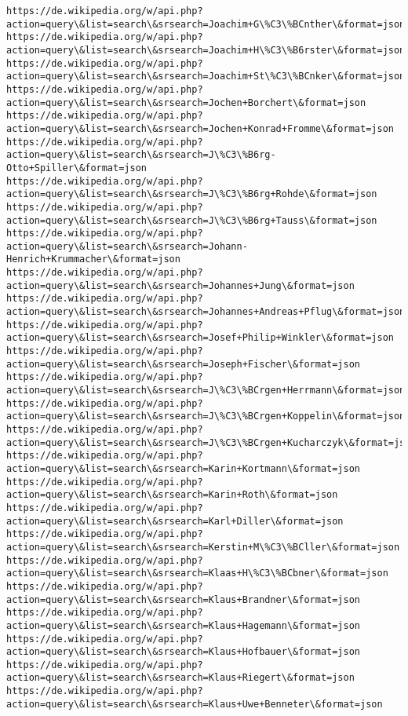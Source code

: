 \documentclass[11pt]{article}
\begin{document}
\begin{Verbatim}[commandchars=\\\{\}]
https://de.wikipedia.org/w/api.php?action=query\&list=search\&srsearch=Joachim+G\%C3\%BCnther\&format=json
https://de.wikipedia.org/w/api.php?action=query\&list=search\&srsearch=Joachim+H\%C3\%B6rster\&format=json
https://de.wikipedia.org/w/api.php?action=query\&list=search\&srsearch=Joachim+St\%C3\%BCnker\&format=json
https://de.wikipedia.org/w/api.php?action=query\&list=search\&srsearch=Jochen+Borchert\&format=json
https://de.wikipedia.org/w/api.php?action=query\&list=search\&srsearch=Jochen+Konrad+Fromme\&format=json
https://de.wikipedia.org/w/api.php?action=query\&list=search\&srsearch=J\%C3\%B6rg-Otto+Spiller\&format=json
https://de.wikipedia.org/w/api.php?action=query\&list=search\&srsearch=J\%C3\%B6rg+Rohde\&format=json
https://de.wikipedia.org/w/api.php?action=query\&list=search\&srsearch=J\%C3\%B6rg+Tauss\&format=json
https://de.wikipedia.org/w/api.php?action=query\&list=search\&srsearch=Johann-Henrich+Krummacher\&format=json
https://de.wikipedia.org/w/api.php?action=query\&list=search\&srsearch=Johannes+Jung\&format=json
https://de.wikipedia.org/w/api.php?action=query\&list=search\&srsearch=Johannes+Andreas+Pflug\&format=json
https://de.wikipedia.org/w/api.php?action=query\&list=search\&srsearch=Josef+Philip+Winkler\&format=json
https://de.wikipedia.org/w/api.php?action=query\&list=search\&srsearch=Joseph+Fischer\&format=json
https://de.wikipedia.org/w/api.php?action=query\&list=search\&srsearch=J\%C3\%BCrgen+Herrmann\&format=json
https://de.wikipedia.org/w/api.php?action=query\&list=search\&srsearch=J\%C3\%BCrgen+Koppelin\&format=json
https://de.wikipedia.org/w/api.php?action=query\&list=search\&srsearch=J\%C3\%BCrgen+Kucharczyk\&format=json
https://de.wikipedia.org/w/api.php?action=query\&list=search\&srsearch=Karin+Kortmann\&format=json
https://de.wikipedia.org/w/api.php?action=query\&list=search\&srsearch=Karin+Roth\&format=json
https://de.wikipedia.org/w/api.php?action=query\&list=search\&srsearch=Karl+Diller\&format=json
https://de.wikipedia.org/w/api.php?action=query\&list=search\&srsearch=Kerstin+M\%C3\%BCller\&format=json
https://de.wikipedia.org/w/api.php?action=query\&list=search\&srsearch=Klaas+H\%C3\%BCbner\&format=json
https://de.wikipedia.org/w/api.php?action=query\&list=search\&srsearch=Klaus+Brandner\&format=json
https://de.wikipedia.org/w/api.php?action=query\&list=search\&srsearch=Klaus+Hagemann\&format=json
https://de.wikipedia.org/w/api.php?action=query\&list=search\&srsearch=Klaus+Hofbauer\&format=json
https://de.wikipedia.org/w/api.php?action=query\&list=search\&srsearch=Klaus+Riegert\&format=json
https://de.wikipedia.org/w/api.php?action=query\&list=search\&srsearch=Klaus+Uwe+Benneter\&format=json

\end{Verbatim}
\end{document}

